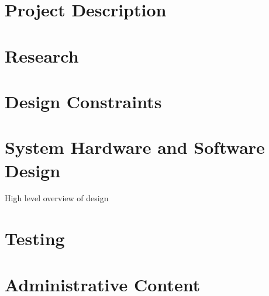 \documentclass[12pt]{article}
\begin{document}
\section{Project Description}                   %
\section{Research}                              %
\section{Design Constraints}                    %
\section{System Hardware and Software Design}   %
High level overview of design
\section{Testing}                               %
\section{Administrative Content}                %
\end{document}
